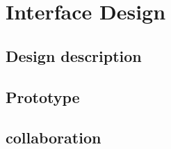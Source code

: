 \chapter{Interface Design}


\section{Design description}


\section{Prototype}


\section{collaboration}





